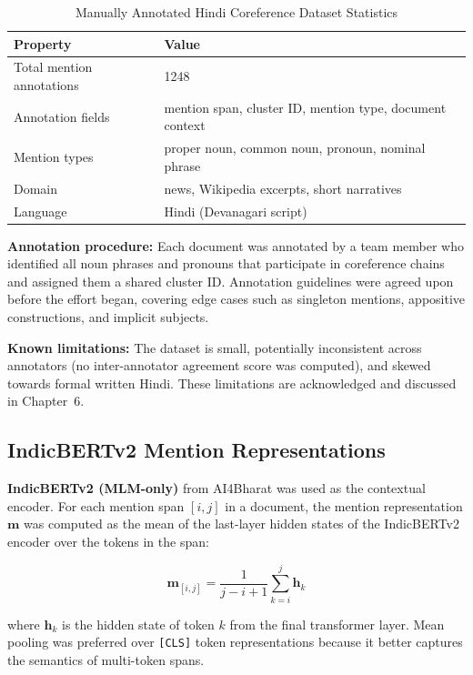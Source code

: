 \documentclass[12pt,a4paper]{report}
\begin{document}
\begin{table}[H]
\centering
\caption{Manually Annotated Hindi Coreference Dataset Statistics}
\begin{tabular}{|l|l|}
\hline
\textbf{Property} & \textbf{Value} \\
\hline
Total mention annotations & 1248 \\
Annotation fields & mention span, cluster ID, mention type, document context \\
Mention types & proper noun, common noun, pronoun, nominal phrase \\
Domain & news, Wikipedia excerpts, short narratives \\
Language & Hindi (Devanagari script) \\
\hline
\end{tabular}
\end{table}

\noindent \textbf{Annotation procedure:} Each document was annotated by a team member who identified all noun phrases and pronouns that participate in coreference chains and assigned them a shared cluster ID. Annotation guidelines were agreed upon before the effort began, covering edge cases such as singleton mentions, appositive constructions, and implicit subjects.

\noindent \textbf{Known limitations:} The dataset is small, potentially inconsistent across annotators (no inter-annotator agreement score was computed), and skewed towards formal written Hindi. These limitations are acknowledged and discussed in Chapter~6.

\subsection{IndicBERTv2 Mention Representations}

\textbf{IndicBERTv2 (MLM-only)} \cite{doddapaneni2023indicbert} from AI4Bharat was used as the contextual encoder. For each mention span $[i, j]$ in a document, the mention representation $\mathbf{m}$ was computed as the mean of the last-layer hidden states of the IndicBERTv2 encoder over the tokens in the span:

\begin{equation}
\mathbf{m}_{[i,j]} = \frac{1}{j - i + 1} \sum_{k=i}^{j} \mathbf{h}_k
\end{equation}

where $\mathbf{h}_k$ is the hidden state of token $k$ from the final transformer layer. Mean pooling was preferred over \texttt{[CLS]} token representations because it better captures the semantics of multi-token spans.
\end{document}
